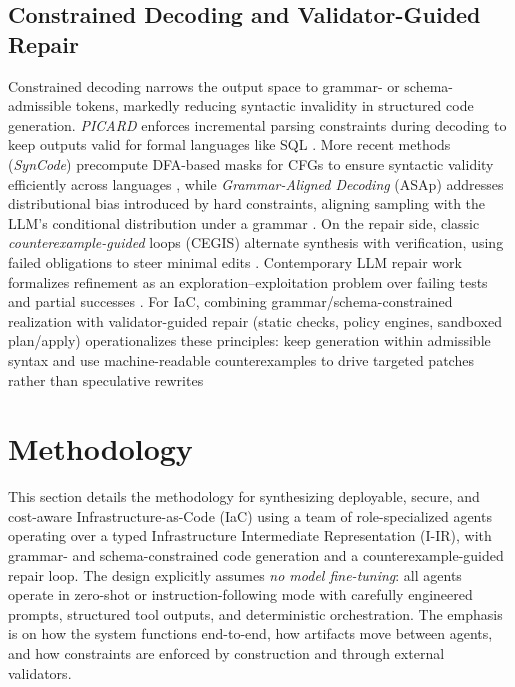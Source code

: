 \documentclass[acmsmall,screen,review,anonymous]{acmart}
\begin{document}
\subsection{Constrained Decoding and Validator-Guided Repair}
Constrained decoding narrows the output space to grammar- or schema-admissible tokens, markedly reducing syntactic invalidity in structured code generation. \emph{PICARD} enforces incremental parsing constraints during decoding to keep outputs valid for formal languages like SQL \cite{scholak2021picard}. More recent methods (\emph{SynCode}) precompute DFA-based masks for CFGs to ensure syntactic validity efficiently across languages \cite{ugare2024syncode}, while \emph{Grammar-Aligned Decoding} (ASAp) addresses distributional bias introduced by hard constraints, aligning sampling with the LLM’s conditional distribution under a grammar \cite{park2024grammar}. On the repair side, classic \emph{counterexample-guided} loops (CEGIS) alternate synthesis with verification, using failed obligations to steer minimal edits \cite{solar2009sketching}. Contemporary LLM repair work formalizes refinement as an exploration–exploitation problem over failing tests and partial successes \cite{tang2024code}. For IaC, combining grammar/schema-constrained realization with validator-guided repair (static checks, policy engines, sandboxed plan/apply) operationalizes these principles: keep generation within admissible syntax and use machine-readable counterexamples to drive targeted patches rather than speculative rewrites





\section{Methodology}
\label{sec:method}

\noindent
This section details the methodology for synthesizing deployable, secure, and cost-aware Infrastructure-as-Code (IaC) using a team of role-specialized agents operating over a typed Infrastructure Intermediate Representation (I-IR), with grammar- and schema-constrained code generation and a counterexample-guided repair loop. The design explicitly assumes \emph{no model fine-tuning}: all agents operate in zero-shot or instruction-following mode with carefully engineered prompts, structured tool outputs, and deterministic orchestration. The emphasis is on how the system functions end-to-end, how artifacts move between agents, and how constraints are enforced by construction and through external validators.
\end{document}
